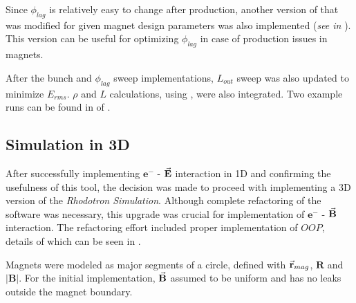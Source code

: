 \documentclass[a4paper,oneside,12pt]{report}
\numberwithin{equation}{chapter}
\begin{document}
Since $\phi_{lag}$ is relatively easy to change after production, another version of  that was modified for given magnet design parameters was also implemented (\textit{see  in }). 
This version can be useful for optimizing $\phi_{lag}$ in case of production issues in magnets. 

After the bunch and $\phi_{lag}$ sweep implementations, $L_{out}$ sweep was also updated to minimize $E_{rms}$. $\rho$ and $L$ calculations, using , were also integrated. 
Two example runs can be found in  of .

\subsection{Simulation in 3D}
After successfully implementing $\textbf{e}^-$ - $\vec{\textbf{E}}$ interaction in 1D and confirming the usefulness of this tool, the decision was made to proceed with implementing a 3D version of the \textit{Rhodotron Simulation}.
Although complete refactoring of the software was necessary, this upgrade was crucial for implementation of $\textbf{e}^-$ - $\vec{\textbf{B}}$ interaction.
The refactoring effort included proper implementation of $OOP$, details of which can be seen in .

Magnets were modeled as major segments of a circle, defined with $\vec{\textbf{r}}_{mag}$, $\textbf{R}$ and $|\textbf{B}|$. 
For the initial implementation, $\vec{\textbf{B}}$ assumed to be uniform and has no leaks outside the magnet boundary.
\end{document}
